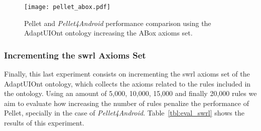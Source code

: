 \begin{figure}
\centering
\texttt{[image: pellet\_abox.pdf]}
\caption{Pellet and \textit{Pellet4Android} performance comparison using the
AdaptUIOnt ontology increasing the ABox axioms set.}
\label{fig:pellet_abox}
\end{figure}

\subsubsection{Incrementing the \ac{swrl} Axioms Set}
\label{sec:eval_swrl}

Finally, this last experiment consists on incrementing the \ac{swrl} axioms set of 
the AdaptUIOnt ontology, which collects the axioms related to the rules
included in the ontology. Using an amount of 5,000, 10,000, 15,000 and 
finally 20,000 rules we aim to evaluate how increasing the number of rules 
penalize the performance of Pellet, specially in the case of 
\textit{Pellet4Android}. Table~\ref{tbl:eval_swrl} shows the results of this
experiment.

